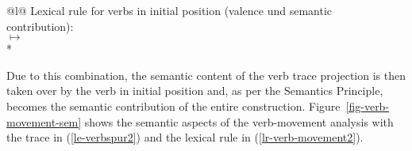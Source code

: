 \ea
\begin{tabular}[t]{@{}l@{}}
Lexical rule for verbs in initial position (valence und semantic\\
contribution):\\
 $\mapsto$\\*
\end{tabular}
\label{lr-verb-movement2}
\z


Due to this combination, the semantic content of the verb trace projection is then taken over by the verb 
in initial position and, as per the Semantics Principle, becomes the semantic contribution of the entire 
construction. Figure~\vref{fig-verb-movement-sem} shows the semantic aspects of the verb-movement analysis with the
trace in (\ref{le-verbspur2}) and the lexical rule in (\ref{lr-verb-movement2}).

